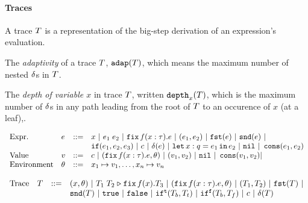 
\paragraph{Traces}
A trace $T$ is a representation of the big-step derivation of an
expression's evaluation.

The \emph{adaptivity} of a trace $T$, $\mathtt{adap}(T)$, which
means the maximum number of nested $\delta$s in $T$.

The \emph{depth of variable $x$} in trace
$T$, written $\mathtt{depth}_{x}(T)$, which is the maximum number of
$\delta{}$s in any path leading from the root of $T$ to an occurence
of $x$ (at a leaf),.%


\[\begin{array}{llll}
\mbox{Expr.} & \expr & ::= & x ~|~ \expr_1 \eapp \expr_2 ~|~ {\efix f(x:\type).\expr}
 ~|~ (\expr_1, \expr_2) ~|~ \eprojl(\expr) ~|~ \eprojr(\expr) ~| \\
%
& & & \eif(\expr_1, \expr_2, \expr_3) ~|~
\econst ~|~ \eop(\expr)  ~|~  {\elet  x:q = \expr_1 \ein \expr_2 } ~|~ \enil ~|~  \econs (
      \expr_1, \expr_2) \\
%
\mbox{Value} & \valr & ::= & \econst ~|~
(\efix f(x:\type).\expr, \env) ~|~ (\valr_1, \valr_2) 
    ~|~ \enil ~|~ \econs (\valr_1, \valr_2) | \\
%
\mbox{Environment} & \env & ::= & x_1 \mapsto \valr_1, \ldots, x_n \mapsto \valr_n
\end{array}\]






%
\[\begin{array}{llll}
\mbox{Trace} & \tr & ::= & {(x, \env)} ~|~ \trapp{\tr_1}{\tr_2}{f}{x}{\tr_3} ~|~
{ (\trfix f(x:\type).e, \env) } ~|~ (\tr_1, \tr_2) ~|~ \trprojl(\tr) ~|\\ 
%
& & & \trprojr(\tr) ~|~ \trtrue ~|~ \trfalse ~|~ \trift(\tr_b, \tr_t)
~|~ \triff(\tr_b, \tr_f) ~|~ \trconst ~|~ \trop(\tr) \\
\end{array}\]




